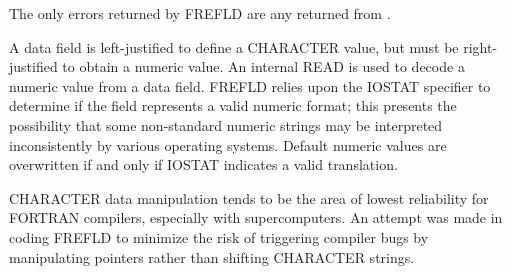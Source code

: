 The only errors returned by FREFLD are any returned from .

A data field is left-justified to define a CHARACTER value, but must be
right-justified to obtain a numeric value.  An internal READ is used to
decode a numeric value from a data field.  FREFLD relies upon the IOSTAT
specifier to determine if the field represents a valid numeric format; this
presents the possibility that some non-standard numeric strings may be
interpreted inconsistently by various operating systems.  Default numeric
values are overwritten if and only if IOSTAT indicates a valid translation.

CHARACTER data manipulation tends to be the area of lowest reliability for
FORTRAN compilers, especially with supercomputers.  An attempt was made in
coding FREFLD to minimize the risk of triggering compiler bugs by
manipulating pointers rather than shifting CHARACTER strings.


